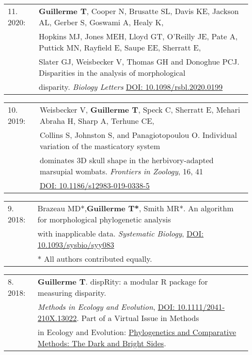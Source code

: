 \documentclass[10pt,a4paper]{article}
\begin{document}
{\begin{tabular}{ll}
11. 2020: & \textbf{Guillerme T}, Cooper N, Brusatte SL, Davis KE, Jackson AL, Gerber S, Goswami A, Healy K,\\
      & Hopkins MJ, Jones MEH, Lloyd GT, O’Reilly JE, Pate A, Puttick MN, Rayfield E, Saupe EE, Sherratt E,\\
      & Slater GJ, Weisbecker V, Thomas GH and Donoghue PCJ. Disparities in the analysis of morphological\\
      & disparity. \textit{Biology Letters} \href{https://royalsocietypublishing.org/doi/10.1098/rsbl.2020.0199}{DOI: 10.1098/rsbl.2020.0199}\\
\end{tabular}
\bigskip

\begin{tabular}{ll}
10. 2019: & Weisbecker V, \textbf{Guillerme T}, Speck C, Sherratt E, Mehari Abraha H, Sharp A, Terhune CE, \\
      & Collins S, Johnston S, and Panagiotopoulou O. Individual variation of the masticatory system \\
      & dominates 3D skull shape in the herbivory-adapted marsupial wombats. \textit{Frontiers in Zoology}, 16, 41\\
      & \href{https://frontiersinzoology.biomedcentral.com/articles/10.1186/s12983-019-0338-5}{DOI: 10.1186/s12983-019-0338-5}\\
\end{tabular}
\bigskip

\begin{tabular}{ll}
9. 2018: & Brazeau MD*,\textbf{Guillerme T*}, Smith MR*. An algorithm for morphological phylogenetic analysis \\
      & with inapplicable data. \textit{Systematic Biology}, \href{https://doi.org/10.1093/sysbio/syy083}{DOI: 10.1093/sysbio/syy083}\\
      & \footnotesize{* All authors contributed equally.}
\end{tabular}

\bigskip

\begin{tabular}{ll}
8. 2018: & \textbf{Guillerme T}. dispRity: a modular R package for measuring disparity.\\
      & \textit{Methods in Ecology and Evolution}, \href{https://besjournals.onlinelibrary.wiley.com/doi/abs/10.1111/2041-210X.13022}{DOI: 10.1111/2041-210X.13022}. Part of a Virtual Issue in Methods\\
      & in Ecology and Evolution: \href{https://besjournals.onlinelibrary.wiley.com/doi/toc/10.1111/(ISSN)2041-210X.PhylogeneticsMEE2019}{Phylogenetics and Comparative Methods: The Dark and Bright Sides}.\\


\end{tabular}}
\end{document}
